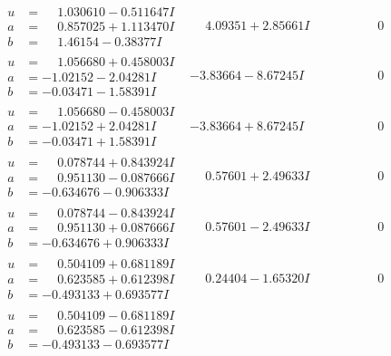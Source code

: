 \documentclass[1p]{elsarticle_modified}
\theoremstyle{definition}
\begin{document}
$$\begin{array}{c|c|c}
\begin{aligned}
u &= \phantom{-}1.030610 - 0.511647 I \\
a &= \phantom{-}0.857025 + 1.113470 I \\
b &= \phantom{-}1.46154 - 0.38377 I\end{aligned}
 & \phantom{-}4.09351 + 2.85661 I & \phantom{-0.000000 } 0 \\ \hline\begin{aligned}
u &= \phantom{-}1.056680 + 0.458003 I \\
a &= -1.02152 - 2.04281 I \\
b &= -0.03471 - 1.58391 I\end{aligned}
 & -3.83664 - 8.67245 I & \phantom{-0.000000 } 0 \\ \hline\begin{aligned}
u &= \phantom{-}1.056680 - 0.458003 I \\
a &= -1.02152 + 2.04281 I \\
b &= -0.03471 + 1.58391 I\end{aligned}
 & -3.83664 + 8.67245 I & \phantom{-0.000000 } 0 \\ \hline\begin{aligned}
u &= \phantom{-}0.078744 + 0.843924 I \\
a &= \phantom{-}0.951130 - 0.087666 I \\
b &= -0.634676 - 0.906333 I\end{aligned}
 & \phantom{-}0.57601 + 2.49633 I & \phantom{-0.000000 } 0 \\ \hline\begin{aligned}
u &= \phantom{-}0.078744 - 0.843924 I \\
a &= \phantom{-}0.951130 + 0.087666 I \\
b &= -0.634676 + 0.906333 I\end{aligned}
 & \phantom{-}0.57601 - 2.49633 I & \phantom{-0.000000 } 0 \\ \hline\begin{aligned}
u &= \phantom{-}0.504109 + 0.681189 I \\
a &= \phantom{-}0.623585 + 0.612398 I \\
b &= -0.493133 + 0.693577 I\end{aligned}
 & \phantom{-}0.24404 - 1.65320 I & \phantom{-0.000000 } 0 \\ \hline\begin{aligned}
u &= \phantom{-}0.504109 - 0.681189 I \\
a &= \phantom{-}0.623585 - 0.612398 I \\
b &= -0.493133 - 0.693577 I\end{aligned}

\end{array}$$
\end{document}
